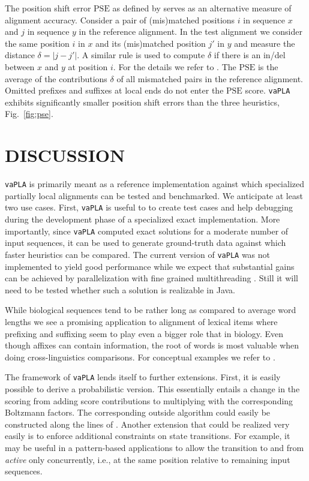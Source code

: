 \documentclass[a4paper,10pt]{article}
\let\cite\citep
\newcommand{\TODO}[1]{\begingroup\color{red}#1\endgroup}
\newcommand{\SAFTWARE}{\texttt{vaPLA}} %
\begin{document}
The position shift error $\mbox{PSE}$ as defined by \citet{oxbench} serves
as an alternative measure of alignment accuracy. Consider a pair of
(mis)matched positions $i$ in sequence $x$ and $j$ in sequence $y$ in the
reference alignment. In the test alignment we consider the same position
$i$ in $x$ and its (mis)matched position $j'$ in $y$ and measure the
distance $\delta=|j-j'|$. A similar rule is used to compute $\delta$ if
there is an in/del between $x$ and $y$ at position $i$. For the details we
refer to \cite{oxbench}. The $\mbox{PSE}$ is the average of the
contributions $\delta$ of all mismatched pairs in the reference alignment.
Omitted prefixes and suffixes at local ends do not enter the $\mbox{PSE}$
score. \SAFTWARE{} exhibits significantly smaller position shift errors
than the three heuristics, Fig.~\ref{fig:pse}.

\section{\uppercase{Discussion}}

\SAFTWARE{} is primarily meant as a reference implementation against which
specialized partially local alignments can be tested and benchmarked. We
anticipate at least two use cases. First, \SAFTWARE{} is useful to to
create test cases and help debugging during the development phase of a
specialized exact implementation. More importantly, since \SAFTWARE{}
computed exact solutions for a moderate number of input sequences, it can
be used to generate ground-truth data against which faster heuristics can
be compared. The current version of \SAFTWARE{} was not implemented to
yield good performance while we expect that substantial gains can be
achieved by parallelization with fine grained multithreading
\cite{Martins:01}. Still it will need to be tested whether such a solution
is realizable in Java.

While biological sequences tend to be rather long as compared to average
word lengths we see a promising application to alignment of lexical items
where prefixing and suffixing seem to play even a bigger role that in
biology. Even though affixes can contain information, the root of words is
most valuable when doing cross-linguistics comparisons. For conceptual
  examples we refer to \cite{Retzlaff:18a}.

The framework of \SAFTWARE{} lends itself to further extensions. First, it
is easily possible to derive a probabilistic version. This essentially
entails a change in the scoring from adding score contributions to
multiplying with the corresponding Boltzmann factors. The corresponding
outside algorithm could easily be constructed along the lines of
\citet{Hoener:15b}. Another extension that could be realized very easily is
to enforce additional constraints on state transitions. For example, it may
be useful in a pattern-based applications to allow the transition to and
from \textit{active} only concurrently, i.e., at the same position relative
to remaining input sequences.
\end{document}
